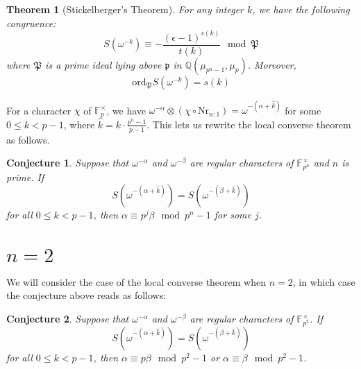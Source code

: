 \documentclass[12pt]{article}
\theoremstyle{customtheorem}%
\newtheorem{theorem}{Theorem}[section]
\newtheorem{conj}{Conjecture}
\theoremstyle{remark}
\theoremstyle{definition}
\numberwithin{equation}{section}
\numberwithin{theorem}{section}
\newcommand{\F}{\mathbb{F}}
\newcommand{\Q}{\mathbb{Q}}
\newcommand{\ord}{\textrm{ord}}
\begin{document}
\begin{theorem}[Stickelberger's Theorem] For any integer $k$, we have the following congruence: \[ S(\omega^{-k}) \equiv -\frac{(\epsilon - 1)^{s(k)}}{t(k)} \mod \mathfrak{P}\] where $\mathfrak{P}$ is a prime ideal lying above $\mathfrak{p}$ in $\Q(\mu_{p^n-1}, \mu_p)$. 
Moreover, \[ \ord_{\mathfrak{P}}S(\omega^{-k}) = s(k)\]
\end{theorem}

For a character $\chi$ of $\F_p^\times$, we have $\omega^{-\alpha} \otimes (\chi \circ \text{Nr}_{n:1}) = \omega^{-(\alpha + \hat{k})}$ for some $0 \leq k < p-1$, where $\hat{k} = k \cdot \frac{p^n - 1}{p-1}$. This lets us rewrite the local converse theorem as follows.
\begin{conj}
Suppose that $\omega^{-\alpha}$ and $\omega^{-\beta}$ are regular characters of $\F_{p^n}^\times$ and $n$ is prime. If \[S(\omega^{-(\alpha + \hat{k})}) = S(\omega^{-(\beta + \hat{k})})\] for all $0 \leq k < p-1$, then $\alpha \equiv p^j \beta \mod p^n - 1$ for some $j$.
\end{conj}

\section{$n=2$} 

We will consider the case of the local converse theorem when $n=2$, in which case the conjecture above reads as follows:

\begin{conj}
Suppose that $\omega^{-\alpha}$ and $\omega^{-\beta}$ are regular characters of $\F_{p^2}^\times$. If \[S(\omega^{-(\alpha + \hat{k})}) = S(\omega^{-(\beta + \hat{k})})\] for all $0 \leq k < p-1$, then $\alpha \equiv p \beta \mod p^2 - 1$ or $\alpha \equiv \beta \mod p^2 - 1$.
\end{conj}
\end{document}
